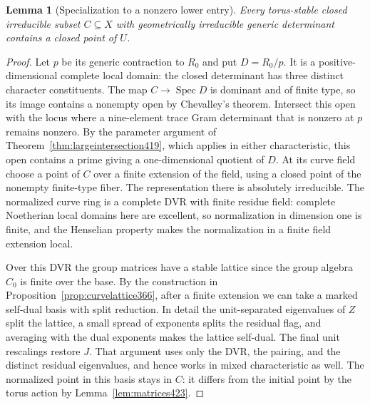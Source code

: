 \documentclass[a4paper,11pt]{article}
\newtheorem{lemma}[proposition]{Lemma}
\theoremstyle{definition}
\theoremstyle{remark}
\numberwithin{equation}{section}
\begin{document}
\begin{lemma}[Specialization to a nonzero lower entry]\leavevmode
\label{lem:specializemarks423}
Every torus-stable closed irreducible subset \(C\subseteq X\)
with geometrically irreducible generic determinant contains a
closed point of \(U\).
\end{lemma}
\begin{proof}
Let \(p\) be its generic contraction to \(R_0\) and put
\(D=R_0/p\). It is a positive-dimensional complete local
domain: the closed determinant has three distinct character
constituents. The map \(C\to\operatorname{Spec}D\) is dominant
and of finite type, so its image contains a nonempty open by
Chevalley's theorem. Intersect this open with the locus where
a nine-element trace Gram determinant that is nonzero at \(p\)
remains nonzero. By the parameter argument of
Theorem~\ref{thm:largeintersection419}, which applies in either
characteristic, this open contains a prime giving a
one-dimensional quotient of \(D\). At its curve field choose
a point of \(C\) over a finite extension of the field, using
a closed point of the nonempty finite-type fiber. The
representation there is absolutely irreducible. The normalized
curve ring is a complete DVR with finite residue field: complete
Noetherian local domains here are excellent, so normalization
in dimension one is finite, and the Henselian property makes
the normalization in a finite field extension local.

Over this DVR the group matrices have a stable lattice since
the group algebra \(C_0\) is finite over the base. By the
construction in Proposition~\ref{prop:curvelattice366}, after
a finite extension we can take a marked self-dual basis with
split reduction. In detail the unit-separated eigenvalues of
\(Z\) split the lattice, a small spread of exponents splits
the residual flag, and averaging with the dual exponents makes
the lattice self-dual. The final unit rescalings restore \(J\).
That argument uses only the DVR, the pairing, and the distinct
residual eigenvalues, and hence works in mixed characteristic
as well. The normalized point in this basis stays in \(C\):
it differs from the initial point by the torus action by
Lemma~\ref{lem:matrices423}.


\end{proof}
\end{document}
